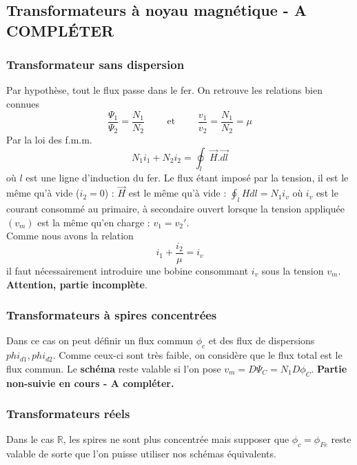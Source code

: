 		
	\subsection{Transformateurs à noyau magnétique - A COMPLÉTER}
		\subsubsection{Transformateur sans dispersion}
		Par hypothèse, tout le flux passe dans le fer. On retrouve les relations 
		bien connues
		\begin{equation}
		\frac{\Psi_1}{\Psi_2} = \frac{N_1}{N_2}\qquad\text{ et }\qquad \frac{v_1}{
		v_2}=\frac{N_1}{N_2} = \mu
		\end{equation}
		Par la loi des f.m.m.
		\begin{equation}
		N_1i_1 + N_2i_2 = \oint_l \vec{H}.\vec{dl}
		\end{equation}
		où $l$ est une ligne d'induction du fer. Le flux étant imposé par la 
		tension, il est le même qu'à vide ($i_2=0$) : $\vec{H}$ est le même 
		qu'à vide : $\oint_l Hdl = N_1i_v$ où $i_v$ est le courant consommé 
		au primaire, à secondaire ouvert lorsque la tension appliquée $(v_m)$ est 
		la même qu'en charge : $v_1=v_2'$.\\
		Comme nous avons la relation
		\begin{equation}
		i_1 + \frac{i_2}{\mu} = i_v
		\end{equation}
		il faut nécessairement introduire une bobine consommant $i_v$ sous la 
		tension $v_m$. \textbf{Attention, partie incomplète}.
		
		\subsubsection{Transformateurs à spires concentrées}
		Dans ce cas on peut définir un flux commun $\phi_c$ et des flux de 
		dispersions $phi_{d1},phi_{d2}$. Comme ceux-ci sont très faible, on 
		considère que le flux total est le flux commun. Le \textbf{schéma}
		reste valable si l'on pose $v_m = D\Psi_C=N_1D\phi_C$.
		\textbf{Partie non-suivie en cours - A compléter.}
		
		
		\subsubsection{Transformateurs réels}
		Dans le cas $\mathbb{R}$, les spires ne sont plus concentrée mais 
		supposer que $\phi_c = \phi_{Fe}$ reste valable de sorte que l'on 
		puisse utiliser nos schémas équivalents.
		

